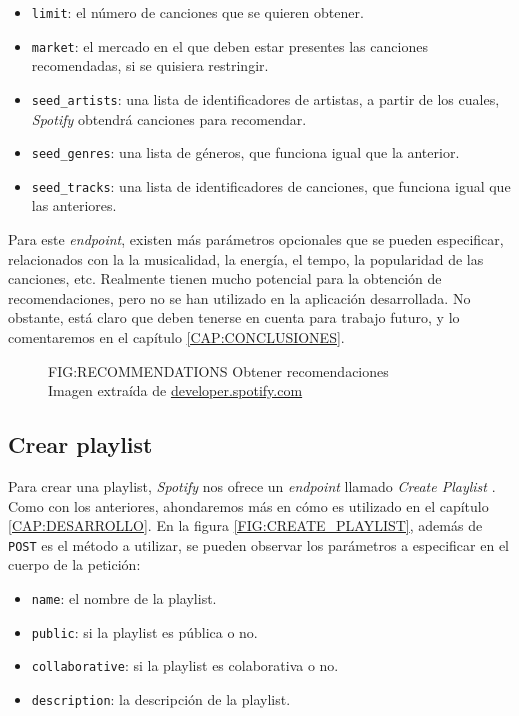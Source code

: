 \begin{itemize}
  \item \texttt{limit}: el número de canciones que se quieren obtener.
  \item \texttt{market}: el mercado en el que deben estar presentes las canciones recomendadas,
  si se quisiera restringir.
  \item \texttt{seed\_artists}: una lista de identificadores de artistas, a partir de los cuales, 
  \textit{Spotify} obtendrá canciones para recomendar.
  \item \texttt{seed\_genres}: una lista de géneros, que funciona igual que la anterior.
  \item \texttt{seed\_tracks}: una lista de identificadores de canciones, que funciona igual que las anteriores.
\end{itemize}

Para este \textit{endpoint}, existen más parámetros opcionales que se pueden especificar, relacionados con la 
la musicalidad, la energía, el tempo, la popularidad de las canciones, etc. Realmente tienen mucho potencial para 
la obtención de recomendaciones, pero no se han utilizado en la aplicación desarrollada. No obstante, está claro 
que deben tenerse en cuenta para trabajo futuro, y lo comentaremos en el capítulo \ref{CAP:CONCLUSIONES}.

\begin{figure}[Obtener recomendaciones]{FIG:RECOMMENDATIONS}
    {Obtener recomendaciones \\
    {\scriptsize Imagen extraída de \href{https://developer.spotify.com/documentation/web-api/reference/get-recommendations}{developer.spotify.com}}}
\end{figure}

\subsection{Crear playlist\label{subsec:crear_playlist}}

Para crear una playlist, \textit{Spotify} nos ofrece un \textit{endpoint} llamado \textit{Create Playlist} \cite{create_playlist}.
Como con los anteriores, ahondaremos más en cómo es utilizado en el capítulo \ref{CAP:DESARROLLO}. En la figura \ref{FIG:CREATE_PLAYLIST}, además de
\texttt{POST} es el método a utilizar, se pueden observar los parámetros a especificar en el cuerpo de la petición:

\begin{itemize}
  \item \texttt{name}: el nombre de la playlist.
  \item \texttt{public}: si la playlist es pública o no.
  \item \texttt{collaborative}: si la playlist es colaborativa o no.
  \item \texttt{description}: la descripción de la playlist.
\end{itemize}

